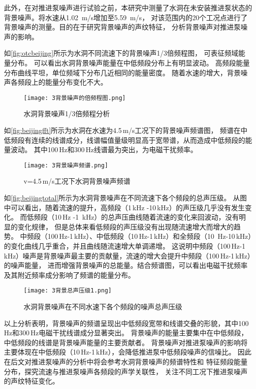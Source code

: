 此外，在对推进泵噪声进行试验之前，本研究中测量了水洞在未安装推进泵状态的背景噪声。将水速从1.02 \,m/s增加至5.59 \,m/s，
对该范围内的20个工况点进行了背景噪声的测量。目的在于研究背景噪声的声纹特征，
分析背景噪声对推进泵噪声的影响。

如\autoref{fig:otcbeijing}所示为水洞不同流速下的背景噪声1/3倍频程图，
可表征频域能量分布。
可以看出水洞背景噪声能量在中低频段分布上有明显波动。
高频段能量分布曲线平坦，单位频域下分布几近相同的能量密度。
随着水速的增大，背景噪声各频段上的能量分布变化不大。
\begin{figure}[htbp]
    \centering
    \texttt{[image: 3背景噪声的倍频程图.png]}
    \caption{\label{fig:otcbeijing}水洞背景噪声1/3倍频程分析}
\end{figure}

如\autoref{fig:beijingfft}所示为水洞在水速为4.5\,m/s工况下的背景噪声频谱图，
频谱在中低频段有连续的线谱成分，线谱幅值量级明显高于宽带谱，从而造成中低频段的能量波动。
其中100\,Hz和300\,Hz线谱最为突出，为电磁干扰频率。
\begin{figure}[htbp]
    \centering
    \texttt{[image: 3背景噪声频谱.png]}
    \caption{\label{fig:beijingfft}v=4.5\,m/s工况下水洞背景噪声频谱}
\end{figure}

如\autoref{fig:beijingtotal}所示为水洞背景噪声在不同流速下各个频段的总声压级。
从图中可以看出，随着流速的提升，高频段（1\,kHz -10\,kHz）的声压级几乎没有发生变化。
而低频段（10\,Hz -1 \,kHz）的总声压曲线随着流速的变化来回波动，没有明显的变化规律，
但是总体来看低频段的声压级没有出现随流速增大而增大的趋势。
中频段（100\,Hz-1\,kHz）、中低频段（10\,Hz-1\,kHz）和全频段（10 \,Hz-10\,kHz）的变化曲线几乎重合，并且曲线随流速增大单调递增。
这说明中频段（100\,Hz-1\,kHz）噪声是背景噪声最主要的贡献量，流速的增大会提升中频段（100\,Hz-1\,kHz）的噪声能量，
进而增强背景噪声的总能量。结合频谱图，可以看出电磁干扰频率及其附近频率成分影响了频谱的能量分布。
\begin{figure}[htbp]
    \centering
    \texttt{[image: 3背景总声压级1.png]}
    \caption{\label{fig:beijingtotal}水洞背景噪声在不同水速下各个频段的噪声总声压级}
\end{figure}



以上分析表明，背景噪声的频谱呈现出中低频段宽带和线谱交叠的形貌，其中100\,Hz和300\,Hz电磁干扰线谱成分显著突出。
背景噪声的能量主要集中在中低频段，中低频段的线谱是背景噪声能量的主要贡献者。
背景噪声对推进泵噪声的影响将主要体现在中低频段（10\,Hz-1\,kHz），会降低推进泵中低频段噪声的信噪比。
因此在后文对推进泵噪声的分析中将会参考水洞背景噪声的频谱特性和
特征频段能量分布，探究流速与推进泵噪声各频段的声学关联性，
关注不同工况下推进泵噪声的声纹特征变化。
